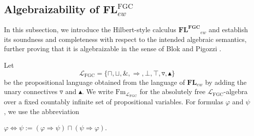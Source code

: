 \documentclass[final,12pt,times]{elsarticle}
\theoremstyle{plain}
\theoremstyle{definition}
\theoremstyle{break}
\begin{document}
\subsection{Algebraizability of $\mathbf{FL}^{\mathrm{FGC}}_{ew}$}
\label{subsection:algebraizability-FGC}

In this subsection, we introduce the Hilbert-style calculus $\mathbf{FL^{FGC}}_{ew}$ and establish its soundness and completeness with respect to the intended algebraic semantics, further proving that it is algebraizable in the sense of Blok and Pigozzi \cite{BlokPigozzi}.
\medskip

Let
\[
 \mathcal L_{\mathrm{FGC}}
   =\{\sqcap,\sqcup,\&,\Rightarrow,\bot,\top,\triangledown,\blacktriangle\}
\]
be the propositional language obtained from the language of
$\mathbf{FL}_{ew}$ by adding the unary connectives $\triangledown$ and
$\blacktriangle$.  We write $\mathrm{Fm}_{\mathcal L_{\mathrm{FGC}}}$ for the
absolutely free $\mathcal L_{\mathrm{FGC}}$-algebra over a fixed countably
infinite set of propositional variables.  For formulas $\varphi$ and $\psi$, we
use the abbreviation
\begin{center}
 $\varphi\Leftrightarrow\psi
   :=(\varphi\Rightarrow\psi)\sqcap(\psi\Rightarrow\varphi)$.
\end{center}
\end{document}
